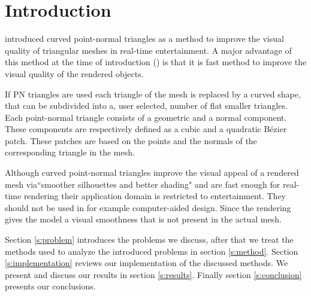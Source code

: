 

\section{Introduction}
\label{s:introduction}

\textcite{vlachos2001curved} introduced curved point-normal triangles as a method to improve the visual quality of triangular meshes in real-time entertainment. A major advantage of this method at the time of introduction (\citeyear{vlachos2001curved}) is that it is fast method to improve the visual quality of the rendered objects.

If PN triangles are used each triangle of the mesh is replaced by a curved shape, that can be subdivided into a, user selected, number of flat smaller triangles. Each point-normal triangle consists of a geometric and a normal component. These components are respectively defined as a cubic and a quadratic Bézier patch. These patches are based on the points and the normals of the corresponding triangle in the mesh. 


Although curved point-normal triangles improve the visual appeal of a rendered mesh via``smoother silhouettes and better shading" \cite{vlachos2001curved} and are fast enough for real-time rendering their application domain is restricted to entertainment. They should not be used in for example computer-aided design. Since the rendering gives the model a visual smoothness that is not present in the actual mesh. 


Section \ref{s:problem} introduces the problems we discuss, after that we treat the methods used to analyze the introduced problems in section \ref{s:method}. Section \ref{s:implementation} reviews our implementation of the discussed methods. We present and discuss our results in section \ref{s:results}. Finally section \ref{s:conclusion} presents our conclusions. 


